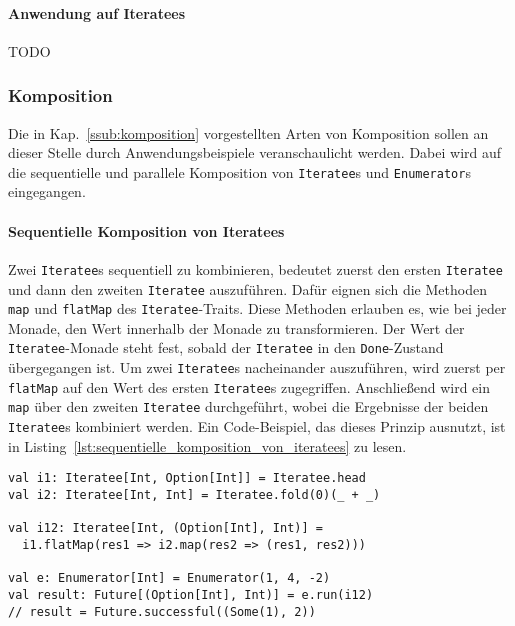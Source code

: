 \documentclass[draft=false
              ,paper=a4
              ,twoside=false
              ,fontsize=11pt
              ,headsepline
              ,BCOR10mm
              ,DIV11
              ]{scrbook}
\begin{document}
\paragraph{Anwendung auf Iteratees} %
\label{par:enumerateeanwendung_auf_iteratees}

TODO




\subsubsection{Komposition} %
\label{ssub:anwendung_komposition}

Die in Kap.~\ref{ssub:komposition} vorgestellten Arten von Komposition sollen an dieser Stelle durch Anwendungsbeispiele veranschaulicht werden.
Dabei wird auf die sequentielle und parallele Komposition von \lstinline|Iteratee|s und \lstinline|Enumerator|s eingegangen.

\paragraph{Sequentielle Komposition von Iteratees} %
\label{p:anwendung_sequentielle_komposition_von_iteratees}\mbox{} %

Zwei \lstinline|Iteratee|s sequentiell zu kombinieren, bedeutet zuerst den ersten \lstinline|Iteratee| und dann den zweiten \lstinline|Iteratee| auszuführen.
Dafür eignen sich die Methoden \lstinline|map| und \lstinline|flatMap| des \lstinline|Iteratee|-Traits.
Diese Methoden erlauben es, wie bei jeder Monade, den Wert innerhalb der Monade zu transformieren.
Der Wert der \lstinline|Iteratee|-Monade steht fest, sobald der \lstinline|Iteratee| in den \lstinline|Done|-Zustand übergegangen ist.
Um zwei \lstinline|Iteratee|s nacheinander auszuführen, wird zuerst per \lstinline|flatMap| auf den Wert des ersten \lstinline|Iteratee|s zugegriffen.
Anschließend wird ein \lstinline|map| über den zweiten \lstinline|Iteratee| durchgeführt, wobei die Ergebnisse der beiden \lstinline|Iteratee|s kombiniert werden.
Ein Code-Beispiel, das dieses Prinzip ausnutzt, ist in Listing~\ref{lst:sequentielle_komposition_von_iteratees} zu lesen.

\begin{lstlisting}[caption=Sequentielle Komposition von Iteratees, label=lst:sequentielle_komposition_von_iteratees]
val i1: Iteratee[Int, Option[Int]] = Iteratee.head
val i2: Iteratee[Int, Int] = Iteratee.fold(0)(_ + _)

val i12: Iteratee[Int, (Option[Int], Int)] =
  i1.flatMap(res1 => i2.map(res2 => (res1, res2)))

val e: Enumerator[Int] = Enumerator(1, 4, -2)
val result: Future[(Option[Int], Int)] = e.run(i12)
// result = Future.successful((Some(1), 2))
\end{lstlisting}
\end{document}

